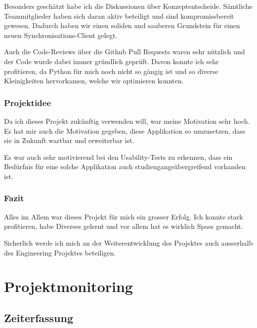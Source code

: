 \documentclass[a4paper]{article}
\let\oldsection\section
\renewcommand\section{\clearpage\oldsection}
\begin{document}
Besonders geschätzt habe ich die Diskussionen über Konzeptentscheide.
Sämtliche Teammitglieder haben sich daran aktiv beteiligt und sind kompromissbereit gewesen.
Dadurch haben wir einen soliden und sauberen Grundstein für einen neuen Synchronisations-Client gelegt.

Auch die Code-Reviews über die Github Pull Requests waren sehr nützlich und der Code wurde dabei immer gründlich geprüft.
Davon konnte ich sehr profitieren, da Python für mich noch nicht so gängig ist und so diverse Kleinigkeiten hervorkamen, welche wir optimieren konnten.

\subsubsection{Projektidee}

Da ich dieses Projekt zukünftig verwenden will, war meine Motivation sehr hoch.
Es hat mir auch die Motivation gegeben, diese Applikation so umzusetzen, dass sie in Zukunft wartbar und erweiterbar ist.

Es war auch sehr motivierend bei den Usability-Tests zu erkennen, dass ein Bedürfnis für eine solche Applikation auch studiengangsübergreifend vorhanden ist.

\subsubsection{Fazit}

Alles im Allem war dieses Projekt für mich ein grosser Erfolg.
Ich konnte stark profitieren, habe Diverses gelernt und vor allem hat es wirklich Spass gemacht.

Sicherlich werde ich mich an der Weiterentwicklung des Projektes auch ausserhalb des Engineering Projektes beteiligen.

\section{Projektmonitoring}

\subsection{Zeiterfassung}
\end{document}
